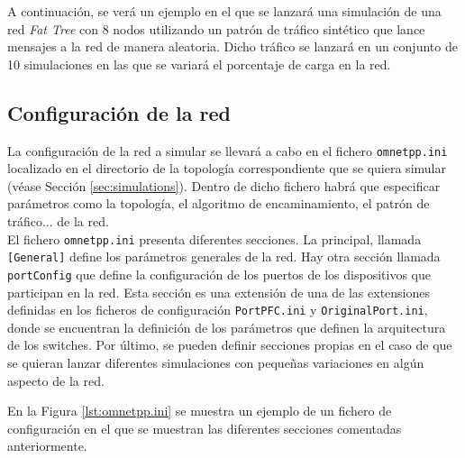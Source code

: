 A continuación, se verá un ejemplo en el que se lanzará una simulación de una red \emph{Fat Tree} con 8 nodos utilizando un patrón de tráfico sintético que lance mensajes a la red de manera aleatoria. Dicho tráfico se lanzará en un conjunto de 10 simulaciones en las que se variará el porcentaje de carga en la red.

\subsection{Configuración de la red}
La configuración de la red a simular se llevará a cabo en el fichero \verb|omnetpp.ini| localizado en el directorio de la topología correspondiente que se quiera simular (véase Sección \ref{sec:simulations}). Dentro de dicho fichero habrá que especificar parámetros como la topología, el algoritmo de encaminamiento, el patrón de tráfico... de la red.\\

El fichero \verb|omnetpp.ini| presenta diferentes secciones. La principal, llamada \verb|[General]| define los parámetros generales de la red. Hay otra sección llamada \verb|portConfig| que define la configuración de los puertos de los dispositivos que participan en la red. Esta sección es una extensión de una de las extensiones definidas en los ficheros de configuración \verb|PortPFC.ini| y \verb|OriginalPort.ini|, donde se encuentran la definición de los parámetros que definen la arquitectura de los switches. Por último, se pueden definir secciones propias en el caso de que se quieran lanzar diferentes simulaciones con pequeñas variaciones en algún aspecto de la red.

En la Figura \ref{lst:omnetpp.ini} se muestra un ejemplo de un fichero de configuración en el que se muestran las diferentes secciones comentadas anteriormente.

